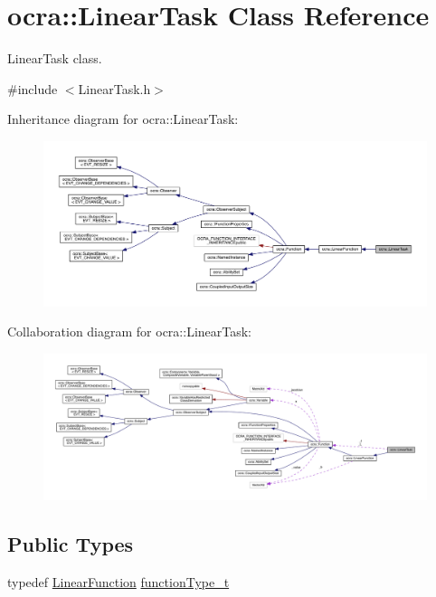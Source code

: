 \hypertarget{classocra_1_1LinearTask}{}\section{ocra\+:\+:Linear\+Task Class Reference}
\label{classocra_1_1LinearTask}


Linear\+Task class.  




{\ttfamily \#include $<$Linear\+Task.\+h$>$}



Inheritance diagram for ocra\+:\+:Linear\+Task\+:\nopagebreak
\begin{figure}[H]
\begin{center}
\leavevmode
\includegraphics[width=350pt]{d6/d21/classocra_1_1LinearTask__inherit__graph}
\end{center}
\end{figure}


Collaboration diagram for ocra\+:\+:Linear\+Task\+:\nopagebreak
\begin{figure}[H]
\begin{center}
\leavevmode
\includegraphics[width=350pt]{db/d92/classocra_1_1LinearTask__coll__graph}
\end{center}
\end{figure}
\subsection*{Public Types}
\begin{DoxyCompactItemize}
\item 
typedef \hyperlink{classocra_1_1LinearFunction}{Linear\+Function} \hyperlink{classocra_1_1LinearTask_a72e12356b5513585a17c44d00d819289}{function\+Type\+\_\+t}
\end{DoxyCompactItemize}
